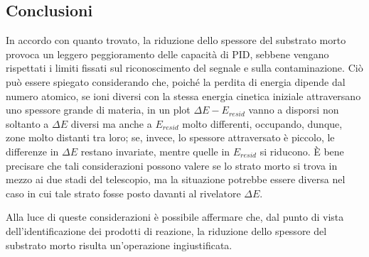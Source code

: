 \subsection*{Conclusioni}

In accordo con quanto trovato, la riduzione dello spessore del substrato morto provoca un leggero peggioramento delle capacità di PID, sebbene vengano rispettati i limiti fissati sul riconoscimento del segnale e sulla contaminazione.
Ciò può essere spiegato considerando che, poiché la perdita di energia dipende dal numero atomico, se ioni diversi con la stessa energia cinetica iniziale attraversano uno spessore grande di materia, in un plot $\Delta E - E_{resid}$ vanno a disporsi non soltanto a $\Delta E$ diversi ma anche a $E_{resid}$ molto differenti, occupando, dunque, zone molto distanti tra loro; se, invece, lo spessore attraversato è piccolo, le differenze in $\Delta E$ restano invariate, mentre quelle in $E_{resid}$ si riducono.
È bene precisare che tali considerazioni possono valere se lo strato morto si trova in mezzo ai due stadi del telescopio, ma la situazione potrebbe essere diversa nel caso in cui tale strato fosse posto davanti al rivelatore $\Delta E$.

Alla luce di queste considerazioni è possibile affermare che, dal punto di vista dell'identificazione dei prodotti di reazione, la riduzione dello spessore del substrato morto risulta un'operazione ingiustificata.











